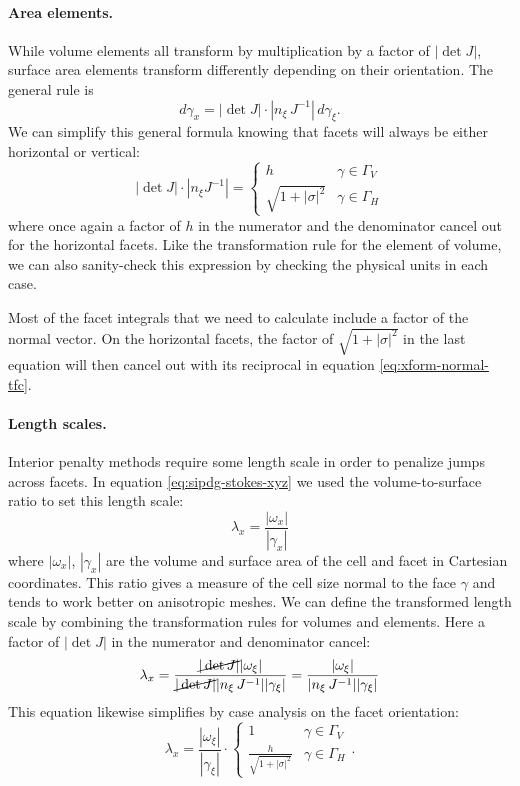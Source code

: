 \documentclass[gmd, manuscript]{copernicus}
\begin{document}
\paragraph{Area elements.}
While volume elements all transform by multiplication by a factor of $|\det J|$, surface area elements transform differently depending on their orientation.
The general rule is
\begin{equation}
    d\gamma_x = |\det J|\cdot |n_\xi\,J^{-1}|\,d\gamma_\xi.
    \label{eq:xform-area}
\end{equation}
We can simplify this general formula knowing that facets will always be either horizontal or vertical:
\begin{equation}
    |\det J|\cdot|n_\xi J^{-1}| = \begin{cases} h & \gamma \in \Gamma_V \\ \sqrt{1 + |\sigma|^2} & \gamma \in \Gamma_H \end{cases}
\end{equation}
where once again a factor of $h$ in the numerator and the denominator cancel out for the horizontal facets.
Like the transformation rule for the element of volume, we can also sanity-check this expression by checking the physical units in each case.

Most of the facet integrals that we need to calculate include a factor of the normal vector.
On the horizontal facets, the factor of $\sqrt{1 + |\sigma|^2}$ in the last equation will then cancel out with its reciprocal in equation \eqref{eq:xform-normal-tfc}.

\paragraph{Length scales.}
Interior penalty methods require some length scale in order to penalize jumps across facets.
In equation \eqref{eq:sipdg-stokes-xyz} we used the volume-to-surface ratio to set this length scale:
\begin{equation}
    \lambda_x = \frac{|\omega_x|}{|\gamma_x|}
\end{equation}
where $|\omega_x|$, $|\gamma_x|$ are the volume and surface area of the cell and facet in Cartesian coordinates.
This ratio gives a measure of the cell size normal to the face $\gamma$ and tends to work better on anisotropic meshes.
We can define the transformed length scale by combining the transformation rules for volumes and elements.
Here a factor of $|\det J|$ in the numerator and denominator cancel:
\begin{equation}
    \lambda_x = \frac{\cancel{|\det J|}|\omega_\xi|}{\cancel{|\det J|}|n_\xi\,J^{-1}||\gamma_\xi|} = \frac{|\omega_\xi|}{|n_\xi\,J^{-1}||\gamma_\xi|}
    \label{eq:xform-length-scale}
\end{equation}
This equation likewise simplifies by case analysis on the facet orientation:
\begin{equation}
    \lambda_x = \frac{|\omega_\xi|}{|\gamma_\xi|}\cdot \begin{cases}1 & \gamma\in\Gamma_V \\ \frac{h}{\sqrt{1 + |\sigma|^2}} & \gamma\in\Gamma_H\end{cases}.
\end{equation}
\end{document}

